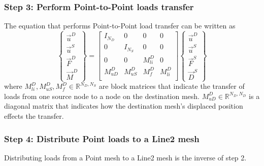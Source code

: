 \documentclass[10pt,letterpaper,oneside,notitlepage]{article}
\begin{document}
\subsubsection{Step 3: Perform Point-to-Point loads transfer}
The equation that performs Point-to-Point load transfer can be written as
\begin{equation}
\label{P2P}
   \left\{   \begin{matrix} \vec{u}^D \\ \vec{u}^{S} \\ \vec{F}^{D} \\ \vec{M}^{D} \end{matrix} \right\} 
=
   \begin{bmatrix}
   I_{\mathit{N_D}} & 0                      & 0          & 0          \\
   0                & I_{\mathit{N_{S}}}     & 0          & 0          \\
   0                & 0                      & M_{li}^{D} & 0          \\
   M_{uD}^{D}       & M_{uS}^{D}             & M_{f}^{D}  & M_{li}^{D} \\
   \end{bmatrix}
   \left\{   \begin{matrix} \vec{u}^D \\ \vec{u}^{S}  \\ \vec{F}^{S}  \\ \vec{D}^{S} \end{matrix} \right\} 
\end{equation}
where $M_{li}^{D}, M_{uS}^{D}, M_{f}^{D} \in \mathbb{R}^{ \mathit{N_{D}},\mathit{N_{S}}}$ are block matrices that indicate the transfer of loads from one source
node to a node on the destination mesh. $M_{uD}^{D} \in \mathbb{R}^{ \mathit{N_{D}},\mathit{N_{D}}}$ is a diagonal matrix that indicates how the destination mesh's displaced position effects the transfer.


\subsubsection{Step 4: Distribute Point loads to a Line2 mesh}
Distributing loads from a Point mesh to a Line2 mesh is the inverse of step 2.
\end{document}
